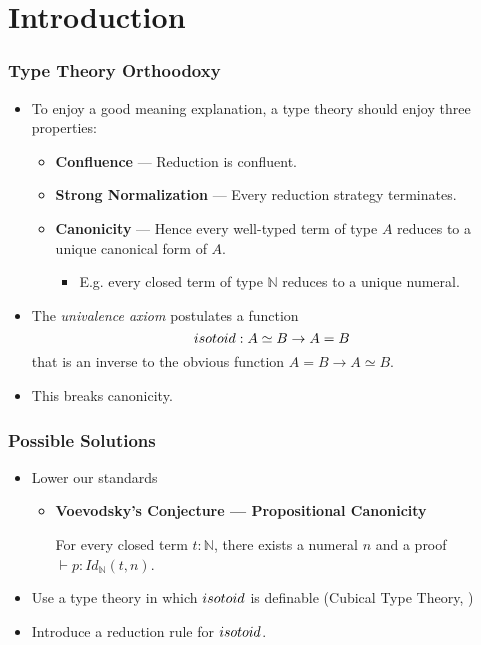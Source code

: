 \section{Introduction}

\begin{frame}
\frametitle{Type Theory Orthoodoxy}
\begin{itemize}[<+->]
\item
To enjoy a good meaning explanation, a type theory should enjoy three properties:
\begin{itemize}
\item \textbf{Confluence} --- Reduction is confluent.
\item \textbf{Strong Normalization} --- Every reduction strategy terminates.
\item \textbf{Canonicity} --- Hence every well-typed term of type $A$ reduces to a unique canonical form of $A$.
\begin{itemize}
\item
E.g. every closed term of type $\mathbb{N}$ reduces to a unique numeral.
\end{itemize}
\end{itemize}
\item 
The \emph{univalence axiom} postulates a function
\[ isotoid : A \simeq B \rightarrow A = B \]
that is an inverse to the obvious function $A = B \rightarrow A \simeq B$.
\item
This breaks canonicity.
\end{itemize}
\end{frame}

\begin{frame}
\frametitle{Possible Solutions}
\begin{itemize}[<+->]
\item
Lower our standards
\begin{itemize}
\item
\textbf{Voevodsky's Conjecture --- Propositional Canonicity}

For every closed term $t : \mathbb{N}$, there exists a numeral $n$ and a proof $\vdash p : Id_\mathbb{N}(t,n)$.
\end{itemize}
\item
Use a type theory in which $isotoid$ is definable (Cubical Type Theory, \cite{Polonsky14a}) %
\item
Introduce a reduction rule for $isotoid$.
\end{itemize}
\end{frame}

